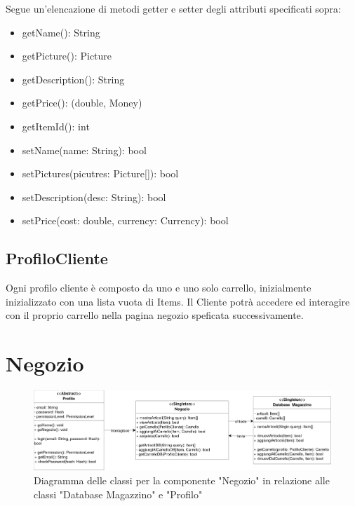 \documentclass{report}
\begin{document}
Segue un'elencazione di metodi getter e setter degli attributi specificati sopra:
\begin{itemize}
\item getName(): String

\item getPicture(): Picture

\item getDescription(): String

\item getPrice(): (double, Money)

\item getItemId(): int

\item setName(name: String): bool

\item setPictures(picutres: Picture[]): bool

\item setDescription(desc: String): bool

\item setPrice(cost: double, currency: Currency): bool

\end{itemize}

\subsection*{ProfiloCliente}

Ogni profilo cliente è composto da uno e uno solo carrello, inizialmente inizializzato con una lista vuota di Items. Il Cliente potrà accedere ed interagire con il proprio carrello nella pagina negozio speficata successivamente.


\section{Negozio}


\begin{figure}[H]
	\centering\includegraphics[width=1\textwidth]{images/Diagramma_delle_classi_negozio_2.png}
	Diagramma delle classi per la componente "Negozio" in relazione alle classi "Database Magazzino" e "Profilo"
\end{figure}
\end{document}

